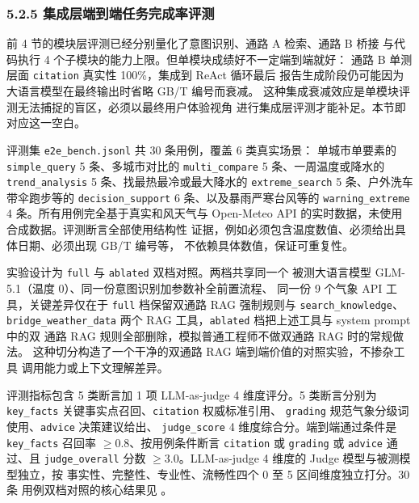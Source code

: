 
\subsubsection*{5.2.5 \quad 集成层端到端任务完成率评测}
\label{sec:e2e-eval}

前 4 节的模块层评测已经分别量化了意图识别、通路 A 检索、通路 B 桥接
与代码执行 4 个子模块的能力上限。但单模块成绩好不一定端到端就好：
通路 B 单测层面 \texttt{citation} 真实性 100\%，集成到 ReAct 循环最后
报告生成阶段仍可能因为大语言模型在最终输出时省略 GB/T 编号而衰减。
这种集成衰减效应是单模块评测无法捕捉的盲区，必须以最终用户体验视角
进行集成层评测才能补足。本节即对应这一空白。

评测集 \texttt{e2e\_\bk{}bench.\bk{}jsonl} 共 30 条用例，覆盖 6 类真实场景：
单城市单要素的 \texttt{simple\_\bk{}query} 5 条、多城市对比的
\texttt{multi\_\bk{}compare} 5 条、一周温度或降水的 \texttt{trend\_\bk{}analysis}
5 条、找最热最冷或最大降水的 \texttt{extreme\_\bk{}search} 5 条、户外洗车
带伞跑步等的 \texttt{decision\_\bk{}support} 6 条、以及暴雨严寒台风等的
\texttt{warning\_\bk{}extreme} 4 条。所有用例完全基于真实和风天气与
Open-Meteo API 的实时数据，未使用合成数据。评测断言全部使用结构性
证据，例如必须包含温度数值、必须给出具体日期、必须出现 GB/T 编号等，
不依赖具体数值，保证可重复性。

实验设计为 \texttt{full} 与 \texttt{ablated} 双档对照。两档共享同一个
被测大语言模型 GLM-5.1（温度 0）、同一份意图识别加参数补全前置流程、
同一份 9 个气象 API 工具，关键差异仅在于 \texttt{full} 档保留双通路
RAG 强制规则与 \texttt{search\_\bk{}knowledge}、\texttt{bridge\_\bk{}weather\_\bk{}data}
两个 RAG 工具，\texttt{ablated} 档把上述工具与 system prompt 中的双
通路 RAG 规则全部删除，模拟普通工程师不做双通路 RAG 时的常规做法。
这种切分构造了一个干净的双通路 RAG 端到端价值的对照实验，不掺杂工具
调用能力或上下文理解差异。

评测指标包含 5 类断言加 1 项 LLM-as-judge 4 维度评分。5 类断言分别为
\texttt{key\_\bk{}facts} 关键事实点召回、\texttt{citation} 权威标准引用、
\texttt{grading} 规范气象分级词使用、\texttt{advice} 决策建议给出、
\texttt{judge\_\bk{}score} 4 维度综合分。端到端通过条件是
\texttt{key\_\bk{}facts} 召回率 $\geq 0.8$、按用例条件断言 \texttt{citation}
或 \texttt{grading} 或 \texttt{advice} 通过、且 \texttt{judge\_\bk{}overall}
分数 $\geq 3.0$。LLM-as-judge 4 维度的 Judge 模型与被测模型独立，按
事实性、完整性、专业性、流畅性四个 0 至 5 区间维度独立打分。30 条
用例双档对照的核心结果见 。

